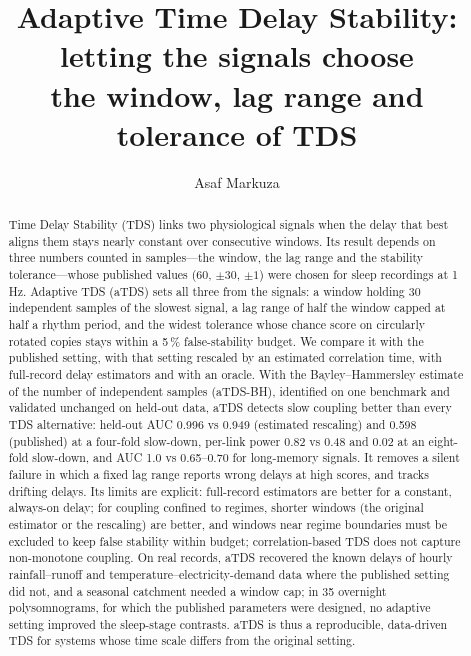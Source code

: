 \documentclass[11pt,a4paper]{article}
\title{Adaptive Time Delay Stability: letting the signals choose\\the window, lag range and tolerance of TDS}
\author{Asaf Markuza}
\date{}
\begin{document}
\maketitle

\begin{abstract}
Time Delay Stability (TDS) links two physiological signals when the delay that best aligns them stays nearly constant over consecutive windows. Its result depends on three numbers counted in samples---the window, the lag range and the stability tolerance---whose published values (60, $\pm30$, $\pm1$) were chosen for sleep recordings at 1\,Hz. Adaptive TDS (aTDS) sets all three from the signals: a window holding 30 independent samples of the slowest signal, a lag range of half the window capped at half a rhythm period, and the widest tolerance whose chance score on circularly rotated copies stays within a 5\,\% false-stability budget. We compare it with the published setting, with that setting rescaled by an estimated correlation time, with full-record delay estimators and with an oracle. With the Bayley--Hammersley estimate of the number of independent samples (aTDS-BH), identified on one benchmark and validated unchanged on held-out data, aTDS detects slow coupling better than every TDS alternative: held-out AUC 0.996 vs 0.949 (estimated rescaling) and 0.598 (published) at a four-fold slow-down, per-link power 0.82 vs 0.48 and 0.02 at an eight-fold slow-down, and AUC 1.0 vs 0.65--0.70 for long-memory signals. It removes a silent failure in which a fixed lag range reports wrong delays at high scores, and tracks drifting delays. Its limits are explicit: full-record estimators are better for a constant, always-on delay; for coupling confined to regimes, shorter windows (the original estimator or the rescaling) are better, and windows near regime boundaries must be excluded to keep false stability within budget; correlation-based TDS does not capture non-monotone coupling. On real records, aTDS recovered the known delays of hourly rainfall--runoff and temperature--electricity-demand data where the published setting did not, and a seasonal catchment needed a window cap; in 35 overnight polysomnograms, for which the published parameters were designed, no adaptive setting improved the sleep-stage contrasts. aTDS is thus a reproducible, data-driven TDS for systems whose time scale differs from the original setting.
\end{abstract}
\end{document}
